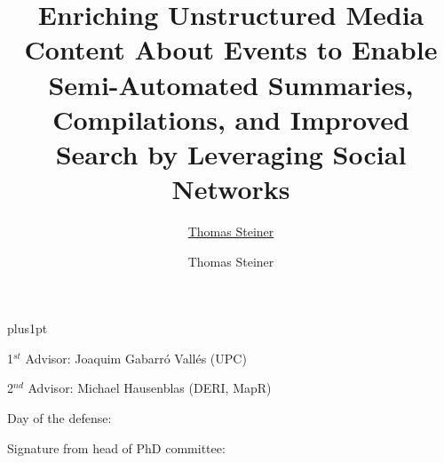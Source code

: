 \documentclass[twoside,11pt]{Latex/Classes/PhDthesisPSnPDF}
\title{Enriching Unstructured Media Content About Events to Enable Semi-Automated Summaries, Compilations, and Improved Search by Leveraging Social Networks}
\author{\href{mailto:tsteiner@lsi.upc.edu}{Thomas Steiner}}
\author{Thomas Steiner}
\begin{document}

\renewcommand\baselinestretch{1.2}
\baselineskip=18pt plus1pt



\maketitle  %



\newpage
\vspace{10mm}
1$^{st}$ Advisor: Joaquim Gabarró Vallés (UPC)

\vspace{10mm}
2$^{nd}$ Advisor: Michael Hausenblas (DERI, MapR)

\vspace{20mm}
Day of the defense: 

\vspace{20mm}
\hspace{70mm}Signature from head of PhD committee:







%   



\frontmatter




\end{document}
